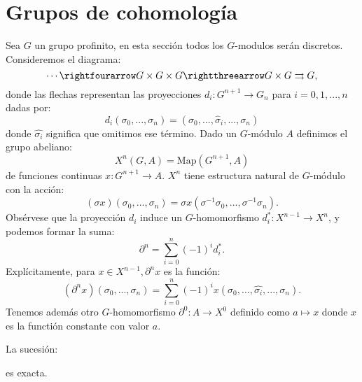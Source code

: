 \documentclass[a4paper,12pt, leqno]{report}
\begin{document}
\section*{Grupos de cohomología}
Sea $G$ un grupo profinito, en esta sección todos los $G$-modulos serán discretos. Consideremos el diagrama:
\begin{equation*}
	\cdots \rightfourarrow G \times G \times G \rightthreearrow G \times G \rightrightarrows G,
\end{equation*}
donde las flechas representan las proyecciones $d_i:G^{n+1}\rightarrow G_n$ para $i=0,1,...,n$ dadas por:
\begin{equation*}
d_i(\sigma_0,...,\sigma_n)=(\sigma_0,...,\hat{\sigma}_i,...,\sigma_n)
\end{equation*}
donde $\hat{\sigma_i}$ significa que omitimos ese término. Dado un $G$-módulo $A$ definimos el grupo abeliano:
\begin{equation*}
X^n(G,A)=\mathrm{Map}(G^{n+1},A)
\end{equation*}
de funciones continuas $x: G^{n+1}\rightarrow A$. $X^n$ tiene estructura natural de $G$-módulo con la acción:
\begin{equation*}
(\sigma x)(\sigma_0,...,\sigma_n)=\sigma x(\sigma^{-1}\sigma_0,...,\sigma^{-1}\sigma_n).
\end{equation*}
Obsérvese que la proyección $d_i$ induce un $G$-homomorfismo $d_i^*:X^{n-1}\rightarrow X^n$, y podemos formar la suma:
\begin{equation*}
\partial^n=\sum_{i=0}^{n}(-1)^i d_i^*.
\end{equation*}
Explícitamente, para $x \in X^{n-1}, \partial^n x$ es la función:
\begin{equation*}
(\partial^n x)(\sigma_0,...,\sigma_n)=\sum_{i=0}^{n}(-1)^i x(\sigma_0,...,\hat{\sigma_i},...,\sigma_n).
\end{equation*}
Tenemos además otro $G$-homomorfismo $\partial^0: A \rightarrow X^0$ definido como $a \mapsto x$ donde $x$ es la functión constante con valor $a$.
\begin{prop}
	La sucesión:
\begin{center}
\end{center}
es exacta.
\end{prop}
\end{document}
